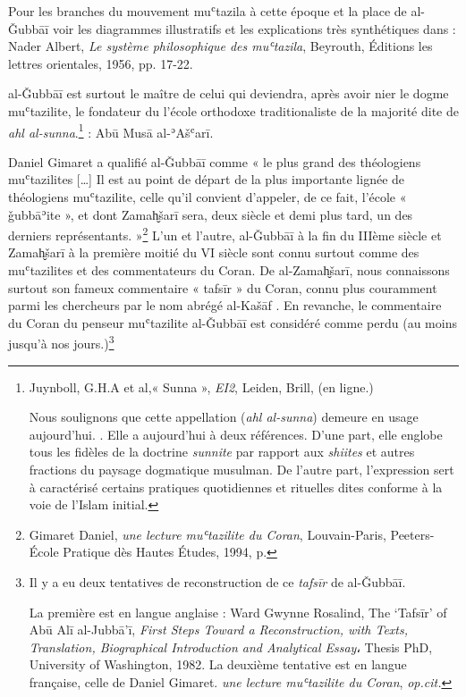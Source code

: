 \documentclass[a4paper,12pt]{report}
\begin{document}
\begin{itemize}
{Pour les branches du mouvement muʿtazila à cette époque et la place de al-Ǧubbāī voir les  diagrammes illustratifs et les explications très synthétiques dans : Nader Albert, \textit{Le système philosophique des muʿtazila}, Beyrouth, Éditions les lettres orientales, 1956, pp. 17-22. 
} 

al-Ǧubbāī est surtout le maître de celui qui deviendra, après avoir nier le dogme muʿtazilite, le fondateur du l’école orthodoxe traditionaliste  de la majorité  dite de \textit{ahl al-sunna}.\footnote{Juynboll, G.H.A et al,« Sunna »,\textit{ EI2}, Leiden, Brill, (en ligne.)

Nous soulignons que cette appellation (\textit{ahl al-sunna}) demeure en usage aujourd'hui. . Elle a aujourd'hui à deux références. D'une part, elle englobe tous les fidèles de la doctrine \textit{sunnite} par rapport aux\textit{ shiites} et autres fractions du paysage dogmatique musulman. De l'autre part, l'expression sert à caractérisé certains pratiques quotidiennes et rituelles dites conforme à la voie de l'Islam initial.} :   Abū Musā al-ʾAšʿarī. 

 Daniel Gimaret a qualifié al-Ǧubbāī comme « le plus grand des théologiens muʿtazilites […] Il est au point de départ de la plus importante lignée de théologiens muʿtazilite, celle qu’il convient d’appeler, de ce fait, l’école « ǧubbāʾite », et dont Zamah̬šarī sera, deux siècle et demi plus tard, un des derniers représentants. »\footnote{Gimaret Daniel, \textit{une lecture muʿtazilite du Coran}, Louvain-Paris, Peeters-École Pratique dès Hautes Études, 1994, p. }
 L’un et l’autre, al-Ǧubbāī à la fin du IIIème siècle et Zamah̬šarī à la première moitié du VI siècle sont connu surtout comme des muʿtazilites et des commentateurs du Coran. De al-Zamah̬šarī, nous connaissons surtout son fameux commentaire « tafsīr » du Coran, connu plus couramment parmi les chercheurs par le nom abrégé al-Kašāf .  En revanche, le commentaire du Coran du penseur muʿtazilite  al-Ǧubbāī est considéré comme perdu (au moins jusqu’à nos jours.)\footnote{Il y a eu deux tentatives de reconstruction de ce \textit{tafsīr} de al-Ǧubbāī. 
 
 La première est en langue anglaise :  Ward Gwynne Rosalind, The ‘Tafsīr’ of Abū Alī al-Jubbā’ī, \textit{First Steps Toward a Reconstruction, with Texts, Translation, Biographical Introduction and Analytical Essay}، Thesis PhD, University of Washington, 1982.  
 La deuxième tentative est en langue française, celle de Daniel Gimaret. \textit{une lecture muʿtazilite du Coran}, \textit{op.cit.}}


\end{itemize}
\end{document}
